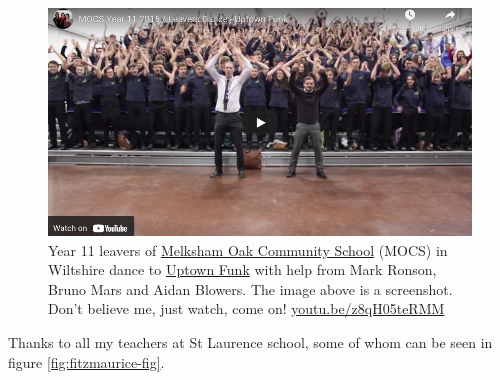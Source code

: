 \documentclass[
]{book}
\begin{document}
\begin{figure}

{\centering \includegraphics[width=1\linewidth]{images/youtube-mocs-uptown-funk} 

}

\caption{Year 11 leavers of \href{https://en.wikipedia.org/wiki/Melksham_Oak_Community_School}{Melksham Oak Community School} (MOCS) in Wiltshire dance to \href{https://en.wikipedia.org/wiki/Uptown_Funk}{Uptown Funk} with help from Mark Ronson, Bruno Mars and Aidan Blowers. The image above is a screenshot. Don't believe me, just watch, come on! \href{https://youtu.be/z8qH05teRMM}{youtu.be/z8qH05teRMM}}\label{fig:uptown-funk-fig}
\end{figure}



Thanks to all my teachers at St Laurence school, some of whom can be seen in figure \ref{fig:fitzmaurice-fig}.
\end{document}
